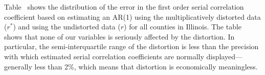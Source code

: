 Table~ shows the distribution of the error in
the first order serial correlation%
 coefficient based on estimating an
AR(1) using the multiplicatively distorted data ($r^*$) and using the
undistorted data ($r$) for all counties in Illinois. The table shows that
none of our variables is seriously affected by the distortion. In
particular, the semi-interquartile range of the distortion is less than the
precision with which estimated serial correlation coefficients are normally
displayed---generally less than 2{\%}, which means that distortion is
economically meaningless.



% 
